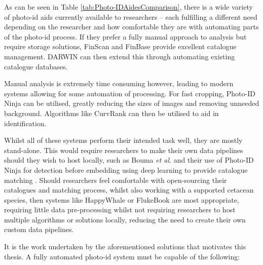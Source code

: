 As can be seen in Table \ref{tab:Photo-IDAidesComparison}, there is a wide variety of photo-id aids currently available to researchers -- each fulfilling a different need depending on the researcher and how comfortable they are with automating parts of the photo-id process. If they prefer a fully manual approach to analysis but require storage solutions, FinScan and FinBase provide excellent catalogue management. DARWIN can then extend this through automating existing catalogue databases. 

Manual analysis is extremely time consuming however, leading to modern systems allowing for some automation of processing. For fast cropping, Photo-ID Ninja can be utilised, greatly reducing the sizes of images and removing unneeded background. Algorithms like CurvRank can then be utilised to aid in identification. 

Whilst all of these systems perform their intended task well, they are mostly stand-alone. This would require researchers to make their own data pipelines should they wish to host locally, such as Bouma \textit{et al}. and their use of Photo-ID Ninja for detection before embedding using deep learning to provide catalogue matching \cite{bouma_individual_2018}. Should researchers feel comfortable with open-sourcing their catalogues and matching process, whilst also working with a supported cetacean species, then systems like HappyWhale or FlukeBook are most appropriate, requiring little data pre-processing whilst not requiring researchers to host multiple algorithms or solutions locally, reducing the need to create their own custom data pipelines. 

It is the work undertaken by the aforementioned solutions that motivates this thesis. A fully automated photo-id system must be capable of the following:

